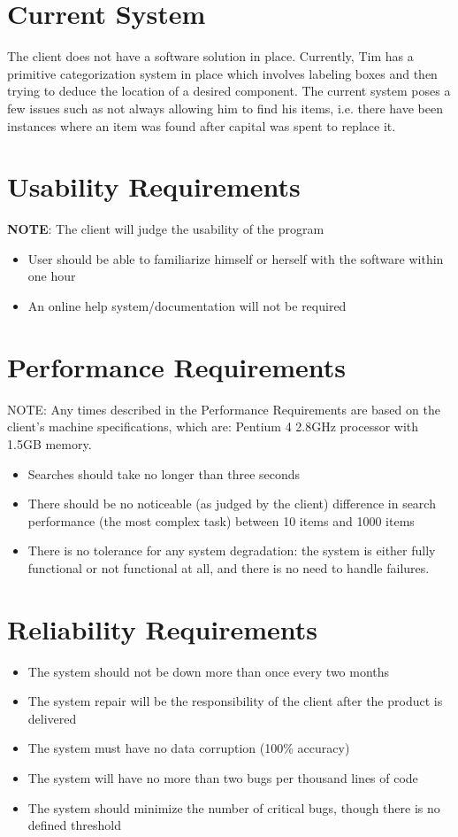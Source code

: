 \documentclass{article}
\begin{document}
\section{Current System}
The client does not have a software solution in place.  Currently, Tim has a primitive categorization system in place which involves labeling boxes and then trying to deduce the location of a desired component.  The current system poses a few issues such as not always allowing him to find his items, i.e. there have been instances where an item was found after capital was spent to replace it.

\section{Usability Requirements}
\textbf{NOTE}: The client will judge the usability of the program
\begin{itemize}
\item User should be able to familiarize himself or herself with the software within one hour
\item An online help system/documentation will not be required
\end{itemize}

\section{Performance Requirements}
NOTE: Any times described in the Performance Requirements are based on the client's machine specifications, which are: Pentium 4 2.8GHz processor with 1.5GB memory.
\begin{itemize}
\item Searches should take no longer than three seconds
\item There should be no noticeable (as judged by the client) difference in search performance (the most complex task) between 10 items and 1000 items
\item There is no tolerance for any system degradation: the system is either fully functional or not functional at all, and there is no need to handle failures.
\end{itemize}

\section{Reliability Requirements}
\begin{itemize}
\item The system should not be down more than once every two months
\item The system repair will be the responsibility of the client after the product is delivered
\item The system must have no data corruption (100\% accuracy)
\item The system will have no more than two bugs per thousand lines of code
\item The system should minimize the number of critical bugs, though there is no defined threshold
\end{itemize}
\end{document}
